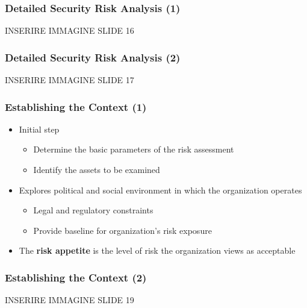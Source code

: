 \documentclass[xcolor ={table,usenames,dvipsnames}]{beamer}
\theoremstyle{definition}
\begin{document}
	\begin{frame}
		\frametitle{Detailed Security Risk Analysis (1)}
		INSERIRE IMMAGINE SLIDE 16
	\end{frame}
	
	\begin{frame}
		\frametitle{Detailed Security Risk Analysis (2)}
		INSERIRE IMMAGINE SLIDE 17
	\end{frame}

	\begin{frame}
		\frametitle{Establishing the Context (1)}
		\begin{itemize}
			\item	Initial step 
			\begin{itemize}
				\item Determine the basic parameters of the risk assessment
				\item Identify the assets to be examined
			\end{itemize}
			\item Explores political and social environment in which the organization operates \begin{itemize}
				\item 	Legal and regulatory constraints
				\item	Provide baseline for organization’s risk exposure
			\end{itemize}
			\item The \textbf{risk appetite} is the level of risk the organization views as acceptable
		\end{itemize}	
	\end{frame}

	\begin{frame}
		\frametitle{Establishing the Context (2)}
		INSERIRE IMMAGINE SLIDE 19
	\end{frame}

	





	

	
\end{document}
